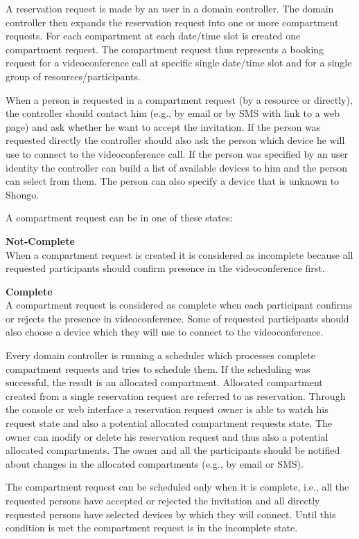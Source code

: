 A reservation request is made by an user in a domain controller. The domain 
controller then expands the reservation request into one or more compartment 
requests. For each compartment at each date/time slot is created one 
compartment request. The compartment request thus represents a booking request 
for a videoconference call at specific single date/time slot and for a single 
group of resources/participants.

When a person is requested in a compartment request (by a resource or directly), the controller should contact him (e.g., by email or by SMS with link to a web page) and ask whether he want to accept the invitation. If the person was requested directly the controller should also ask the person which device he will use to connect to the videoconference call. If the person was specified by an user identity the controller can build a list of available devices to him and the person can select from them. The person can also specify a device that is unknown to Shongo. 

A compartment request can be in one of these states:
\begin{compactenum}
\item \textbf{Not-Complete} \\
  When a compartment request is created it is considered as incomplete 
  because all requested participants should confirm presence in
  the videoconference first.
\item \textbf{Complete} \\
  A compartment request is considered as complete when each participant 
  confirms or rejects the presence in videoconference. Some of
  requested participants should also choose a device which they will use 
  to connect to the videoconference.
\end{compactenum}
Every domain controller is running a scheduler which processes complete compartment requests and tries to schedule them. If the scheduling was successful, the result is an allocated compartment.
Allocated compartment created from a single reservation request are referred to as reservation. Through the console or web interface a reservation request owner is able to watch his request state and also a potential allocated compartment requests state. The owner can modify or delete his reservation request and thus also a potential allocated compartments. The owner and all the participants should be notified about changes in the allocated compartments (e.g., by email or SMS). 

The compartment request can be scheduled only when it is complete, i.e., all the requested persons have accepted or rejected the invitation and all directly requested persons have selected devices by which they will connect. Until this condition is met the compartment request is in the incomplete state.

